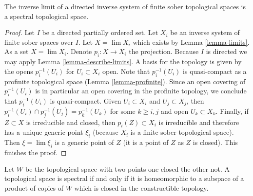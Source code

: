 \begin{lemma}
\label{lemma-directed-inverse-limit-finite-sober-spectral-spaces}
The inverse limit of a directed inverse system of finite sober
topological spaces is a spectral topological space.
\end{lemma}

\begin{proof}
Let $I$ be a directed partially ordered set. Let $X_i$ be an inverse
system of finite sober spaces over $I$. Let $X = \lim X_i$ which exists
by Lemma \ref{lemma-limits}. As a set $X = \lim X_i$. Denote
$p_i : X \to X_i$ the projection.
Because $I$ is directed we may apply Lemma \ref{lemma-describe-limits}.
A basis for the topology is given by the opens
$p_i^{-1}(U_i)$ for $U_i \subset X_i$ open. Note that $p_i^{-1}(U_i)$
is quasi-compact as a profinite topological space
(Lemma \ref{lemma-profinite}). Since an open covering of
$p_i^{-1}(U_i)$ is in particular an open covering in the profinite
topology, we conclude that $p_i^{-1}(U_i)$ is quasi-compact.
Given $U_i \subset X_i$ and $U_j \subset X_j$, then
$p_i^{-1}(U_i) \cap p_j^{-1}(U_j) = p_k^{-1}(U_k)$
for some $k \geq i, j$ and open $U_k \subset X_k$. Finally, if $Z \subset X$
is irreducible and closed, then $p_i(Z) \subset X_i$ is irreducible
and therefore has a unique generic point $\xi_i$ (because $X_i$
is a finite sober topological space). Then $\xi = \lim \xi_i$ is a
generic point of $Z$ (it is a point of $Z$ as $Z$ is closed).
This finishes the proof.
\end{proof}

\begin{lemma}
\label{lemma-spectral-closed-in-product-two-point-space}
Let $W$ be the topological space with two points one closed
the other not. A topological space is spectral if and only if
it is homeomorphic to a subspace of a product of
copies of $W$ which is closed in the constructible topology.
\end{lemma}

